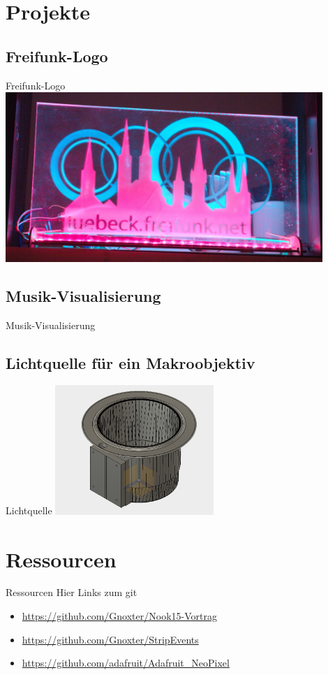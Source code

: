 \documentclass{beamer}
\begin{document}
\section{Projekte}
\subsection{Freifunk-Logo}
\begin{frame}{Freifunk-Logo}
 \centering
 \includegraphics[width=12cm,keepaspectratio=true]{./img/_MGL5102.jpg}
\end{frame}

\subsection{Musik-Visualisierung}
\begin{frame}{Musik-Visualisierung}
\end{frame}

\subsection{Lichtquelle für ein Makroobjektiv}
\begin{frame}{Lichtquelle}
\centering
 \includegraphics[width=6cm,keepaspectratio=true]{./img/screen.png}
\end{frame}

\section{Ressourcen}
\begin{frame}{Ressourcen}
 Hier Links zum git
\begin{itemize}
 \item \url{https://github.com/Gnoxter/Nook15-Vortrag}
 \item \url{https://github.com/Gnoxter/StripEvents}
 \item \url{https://github.com/adafruit/Adafruit_NeoPixel}
\end{itemize}
\end{frame}
\end{document}
